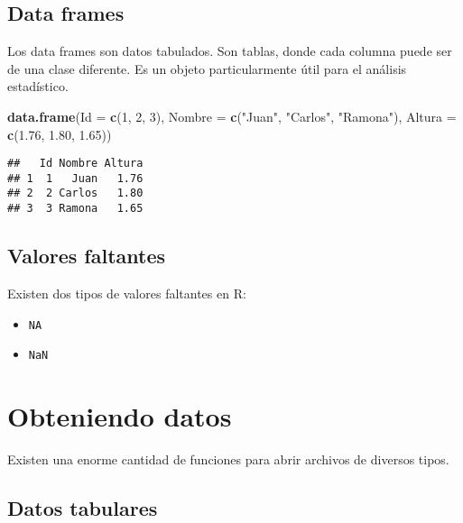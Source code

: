 \documentclass[spanish,]{book}
\newenvironment{Shaded}{\begin{snugshade}}{\end{snugshade}}
\newcommand{\KeywordTok}[1]{\textcolor[rgb]{0.13,0.29,0.53}{\textbf{#1}}}
\newcommand{\DataTypeTok}[1]{\textcolor[rgb]{0.13,0.29,0.53}{#1}}
\newcommand{\DecValTok}[1]{\textcolor[rgb]{0.00,0.00,0.81}{#1}}
\newcommand{\FloatTok}[1]{\textcolor[rgb]{0.00,0.00,0.81}{#1}}
\newcommand{\StringTok}[1]{\textcolor[rgb]{0.31,0.60,0.02}{#1}}
\newcommand{\NormalTok}[1]{#1}
\providecommand{\tightlist}{%
  \setlength{\itemsep}{0pt}\setlength{\parskip}{0pt}}
\begin{document}
\section{Data frames}\label{data-frames}

Los data frames son datos tabulados. Son tablas, donde cada columna
puede ser de una clase diferente. Es un objeto particularmente útil para
el análisis estadístico.

\begin{Shaded}
\begin{Highlighting}[]
\KeywordTok{data.frame}\NormalTok{(}\DataTypeTok{Id =} \KeywordTok{c}\NormalTok{(}\DecValTok{1}\NormalTok{, }\DecValTok{2}\NormalTok{, }\DecValTok{3}\NormalTok{),}
           \DataTypeTok{Nombre =} \KeywordTok{c}\NormalTok{(}\StringTok{"Juan"}\NormalTok{, }\StringTok{"Carlos"}\NormalTok{, }\StringTok{"Ramona"}\NormalTok{),}
           \DataTypeTok{Altura =} \KeywordTok{c}\NormalTok{(}\FloatTok{1.76}\NormalTok{, }\FloatTok{1.80}\NormalTok{, }\FloatTok{1.65}\NormalTok{))}
\end{Highlighting}
\end{Shaded}

\begin{verbatim}
##   Id Nombre Altura
## 1  1   Juan   1.76
## 2  2 Carlos   1.80
## 3  3 Ramona   1.65
\end{verbatim}

\section{Valores faltantes}\label{valores-faltantes}

Existen dos tipos de valores faltantes en R:

\begin{itemize}
\tightlist
\item
  \texttt{NA}
\item
  \texttt{NaN}
\end{itemize}

\chapter{Obteniendo datos}\label{obteniendo-datos}

Existen una enorme cantidad de funciones para abrir archivos de diversos
tipos.

\section{Datos tabulares}\label{datos-tabulares}
\end{document}
